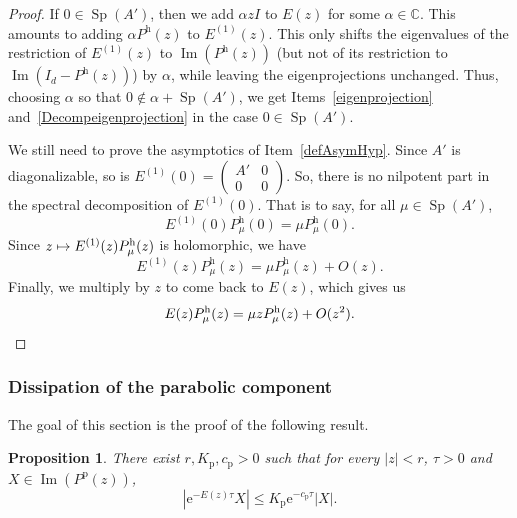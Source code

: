 \documentclass[JEP,XML,SOM,Unicode,NoEqCountersInSection]{cedram}
\def\mto{\mathchoice{\longmapsto}{\mapsto}{\mapsto}{\mapsto}}
\theoremstyle{plain}
\newtheorem{prop}[theorem]{Proposition}
\theoremstyle{definition}
\theoremstyle{remark}
\DeclareMathOperator{\Sp}{Sp}
\DeclareMathOperator{\Ima}{Im}
\let\bigO O
\newcommand{\set}{\mathbb}
\newcommand{\h}{{\mathrm h}}
\newcommand{\p}{{\mathrm p}}
\newcommand{\eu}{\mathrm e}
\begin{document}
\begin{proof}
If $0\in\Sp(A')$, then we add $\alpha zI$ to $E(z)$ for some $\alpha\in\set C$. This amounts to adding $\alpha P^\h(z)$ to $E^{(1)}(z)$. This only shifts the eigenvalues of the restriction of $E^{(1)}(z)$ to $\Ima(P^\h(z))$ (but not of its restriction to $\Ima(I_d-P^\h(z))$) by $\alpha$, while leaving the eigenprojections unchanged. Thus, choosing $\alpha$ so that $0\notin \alpha+\Sp(A')$, we get Items~\eqref{eigenprojection} and~\eqref{Decompeigenprojection} in the case $0\in\Sp(A')$.

We still need to prove the asymptotics of Item~\eqref{defAsymHyp}. Since $A'$ is diagonalizable, so is $E^{(1)}(0) = (\begin{smallmatrix} A'&0\\0&0 \end{smallmatrix})$. So, there is no nilpotent part in the spectral decomposition of $E^{(1)}(0)$. That is to say, for all $\mu\in\Sp(A')$,
\[
E^{(1)}(0)P_\mu^\h(0) = \mu P_\mu^\h(0).
\]
Since $z\mto E^{(1)}(z)P_\mu^\h(z)$ is holomorphic, we have
\[
E^{(1)}(z)P_\mu^\h(z) = \mu P_\mu^\h(z)+\bigO(z).
\]
Finally, we multiply by $z$ to come back to $E(z)$, which gives us
\[
E(z)P_\mu^\h(z) = \mu zP_\mu^\h(z)+\bigO(z^2).\qedhere
\]
\end{proof}

\label{subsubsec:EF_WP}

\subsubsection{Dissipation of the parabolic component}\label{subsubsec:dissipation}

The goal of this section is the proof of the following result.

\begin{prop} \label{Prop:dissip_p}
There exist $r, K_\p, c_\p >0$ such that for every $|z|<r$, $\tau >0$ and $X\in\Ima(P^\p(z))$,
\[
|\eu^{- E(z) \tau} X | \leq K_\p \eu^{-c_\p \tau} |X|.
\]
\end{prop}
\end{document}
